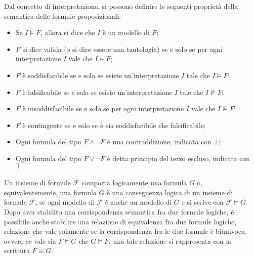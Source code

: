 \noindent
Dal concetto di interpretazione, si possono definire le seguenti proprietà della semantica delle formule proposizionali:
\begin{itemize}
  \item Se \(I\vDash F \), allora si dice che \(I\) è un modello di \(F\);
  \item \(F\) si dice valida (o si dice essere una tautologia) se e solo se per ogni interpretazione \(I\) vale che \(I \vDash F\);
  \item \(F\) è soddisfacibile se e solo se esiste un'interpretazione \(I\) tale che \(I \vDash F\);
  \item \(F\) è falsificabile se e solo se esiste un'interpretazione \(I\) tale che \(I \nvDash F\);
  \item \(F\) è insoddisfacibile se e solo se per ogni interpretazione \(I\) vale che \(I \nvDash F\);
  \item \(F\) è contingente se e solo se è sia soddisfacibile che falsificabile;
  \item Ogni formula del tipo \(F \wedge \lnot F\) è una contraddizione, indicata con \(\bot\);
  \item Ogni formula del tipo \(F \vee \lnot F\) è detta principio del terzo escluso, indicata con \(\top \)
\end{itemize}

\paragraph{}
Un insieme di formule \(\mathcal F\) comporta logicamente una formula \(G\) o, equivalentemente, una formula \(G\) è una conseguenza logica di un insieme di formule \(\mathcal F\), se ogni modello di \(\mathcal F\) è anche un modello di \(G\) e si scrive con \(\mathcal F \vDash G\). Dopo aver stabilito una corrispondenza semantica fra due formule logiche, è possibile anche stabilire una relazione di equivalenza fra due formule logiche, relazione che vale solamente se la corrispondenza fra le due formule è biunivoca, ovvero se vale sia \(F \vDash G\) che \(G \vDash F\): una tale relazione si rappresenta con la scrittura \(F \equiv G\).

